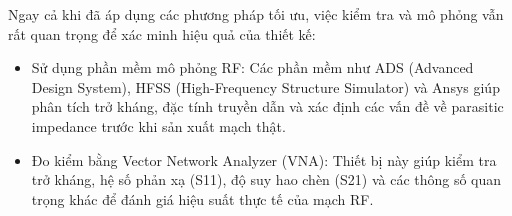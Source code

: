 \hspace{13pt} Ngay cả khi đã áp dụng các phương pháp tối ưu, việc kiểm tra và mô phỏng vẫn rất quan trọng để xác minh hiệu quả của thiết kế:
\begin{itemize}
    \item Sử dụng phần mềm mô phỏng RF: Các phần mềm như ADS (Advanced Design System), HFSS (High-Frequency Structure Simulator) và Ansys giúp phân tích trở kháng, đặc tính truyền dẫn và xác định các vấn đề về parasitic impedance trước khi sản xuất mạch thật.
    \item Đo kiểm bằng Vector Network Analyzer (VNA): Thiết bị này giúp kiểm tra trở kháng, hệ số phản xạ (S11), độ suy hao chèn (S21) và các thông số quan trọng khác để đánh giá hiệu suất thực tế của mạch RF.
\end{itemize}